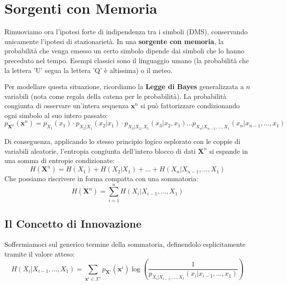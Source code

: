 \section{Sorgenti con Memoria}

Rimuoviamo ora l'ipotesi forte di indipendenza tra i simboli (DMS), conservando unicamente l'ipotesi di stazionarietà. In una \textbf{sorgente con memoria}, la probabilità che venga emesso un certo simbolo dipende dai simboli che lo hanno preceduto nel tempo. Esempi classici sono il linguaggio umano (la probabilità che la lettera 'U' segua la lettera 'Q' è altissima) o il meteo.

Per modellare questa situazione, ricordiamo la \textbf{Legge di Bayes} generalizzata a $n$ variabili (nota come regola della catena per le probabilità). La probabilità congiunta di osservare un'intera sequenza $\mathbf{x}^n$ si può fattorizzare condizionando ogni simbolo al suo intero passato:
\begin{equation}
    p_{\mathbf{X}^n}(\mathbf{x}^n) = p_{X_1}(x_1) \cdot p_{X_2|X_1}(x_2|x_1) \cdot p_{X_3|X_2,X_1}(x_3|x_2,x_1) \dots p_{X_n|X_{n-1},\dots,X_1}(x_n|x_{n-1},\dots,x_1)
\end{equation}

Di conseguenza, applicando lo stesso principio logico esplorato con le coppie di variabili aleatorie, l'entropia congiunta dell'intero blocco di dati $\mathbf{X}^n$ si espande in una somma di entropie condizionate:
\begin{equation}
    H(\mathbf{X}^n) = H(X_1) + H(X_2|X_1) + \dots + H(X_n|X_{n-1}, \dots, X_1)
\end{equation}
Che possiamo riscrivere in forma compatta con una sommatoria:
\begin{equation}
    H(\mathbf{X}^n) = \sum_{i=1}^{n} H(X_i | X_{i-1}, \dots, X_1)
\end{equation}

\subsection{Il Concetto di Innovazione}

Soffermiamoci sul generico termine della sommatoria, definendolo esplicitamente tramite il valore atteso:
\begin{equation}
    H(X_i | X_{i-1}, \dots, X_1) = \sum_{\mathbf{x}^i \in \mathcal{X}^i} p_{\mathbf{X}^i}(\mathbf{x}^i) \log \left( \frac{1}{p_{X_i | X_{i-1}, \dots, X_1}(x_i | x_{i-1}, \dots, x_1)} \right)
\end{equation}

